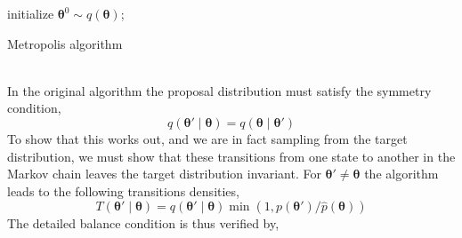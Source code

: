 \begin{algorithm}[h!]\label{algo_2}

\SetAlgoLined
initialize $\boldsymbol{\theta}^0\sim q(\boldsymbol{\theta})$;

\caption{Metropolis algorithm}
\end{algorithm}\\
In the original algorithm the proposal distribution must satisfy the symmetry condition,
\begin{equation*}
    q(\boldsymbol{\theta'}\mid \boldsymbol{\theta})=q(\boldsymbol{\theta}\mid \boldsymbol{\theta'})
\end{equation*}
To show that this works out, and we are in fact sampling from the target distribution, we must show that these transitions from one state to another in the Markov chain leaves the target distribution invariant. For $\boldsymbol{\theta'}\neq \boldsymbol{\theta}$ the algorithm leads to the following transitions densities,
\begin{equation*}
    T\left(\boldsymbol{\theta}' \mid \boldsymbol{\theta}\right)=q\left(\boldsymbol{\theta}' \mid \boldsymbol{\theta}\right) \min \left(1, p\left(\boldsymbol{\theta}'\right) / \hat{p}(\boldsymbol{\theta})\right)
\end{equation*}
The detailed balance condition is thus verified by,
